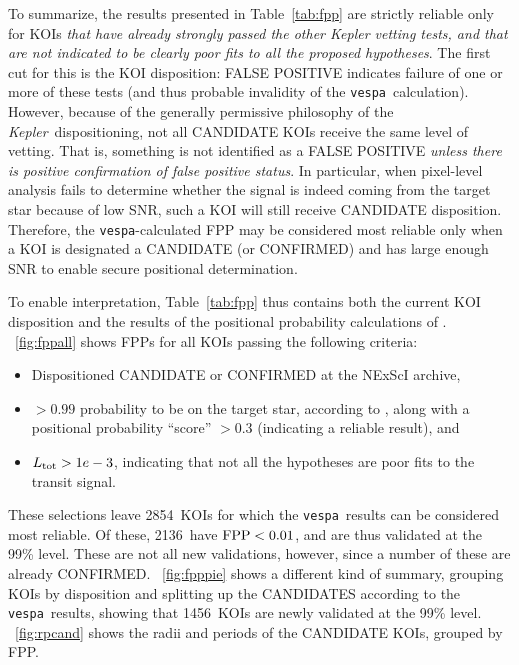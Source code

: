 \documentclass{emulateapj}
\newcommand{\figref}[1]{\ref{fig:#1}}
\newcommand{\Fig}[1]{\figurename~\figref{#1}}
\newcommand{\Tab}[1]{Table~\ref{tab:#1}}
\newcommand{\tab}[1]{\Tab{#1}}
\newcommand{\nreliable}{2854}
\newcommand{\nval}{2136}
\newcommand{\nvalnew}{1456}
\newcommand{\posprobthresh}{0.3}
\newcommand{\kepler}{\textit{Kepler}}
\newcommand{\vespa}{\texttt{vespa}}
\begin{document}
To summarize, the results presented in \tab{fpp} are strictly reliable
only for KOIs \emph{that have already strongly passed the other Kepler
  vetting tests, and that are not indicated to be clearly poor fits to
  all the proposed hypotheses}.  The first cut for this is the KOI
disposition: FALSE POSITIVE indicates failure of one or more of these
tests (and thus probable invalidity of the \vespa\ calculation).
However, because of the generally permissive philosophy of the
\kepler\ dispositioning, not all CANDIDATE KOIs receive the same level
of vetting.  That is, something is not identified as a FALSE POSITIVE
\emph{unless there is positive confirmation of false positive status}.
In particular, when pixel-level analysis fails to determine whether
the signal is indeed coming from the target star because of low SNR,
such a KOI will still receive CANDIDATE disposition.  Therefore, the
\vespa-calculated FPP may be considered most reliable only when a KOI
is designated a CANDIDATE (or CONFIRMED) and has large enough SNR to
enable secure positional determination.


To enable interpretation, \tab{fpp} thus contains both the current KOI
disposition and the results of the positional probability calculations
of \citet{Bryson:KSCI}.  \Fig{fppall} shows FPPs for all KOIs passing
the following criteria:
\begin{itemize}
\item Dispositioned CANDIDATE or CONFIRMED at the NExScI archive,
\item $> 0.99$ probability to be on the target star, according
  to \citet{Bryson:KSCI}, along with a positional probability
  ``score'' $> \posprobthresh$ (indicating a reliable result), and   
\item $L_{\rm tot} > 1e-3$, indicating that not all the hypotheses are
  poor fits to the transit signal.
\end{itemize}

These selections leave \nreliable\ KOIs for which the \vespa\ results
can be considered most reliable.  Of these, \nval\ have ${\rm FPP} <
0.01$, and are thus validated at the 99\% level.  These are not all
new validations, however, since a number of these are already
CONFIRMED.  \Fig{fpppie} shows a different kind of summary, grouping
KOIs by disposition and splitting up the CANDIDATES according to the
\vespa\ results, showing that \nvalnew\ KOIs are newly validated at
the 99\% level.  \Fig{rpcand} shows the radii and periods of the
CANDIDATE KOIs, grouped by FPP.
\end{document}
